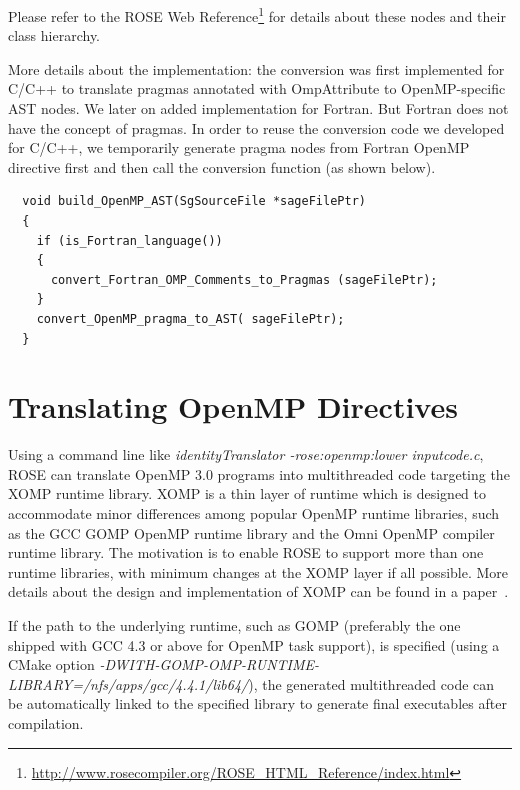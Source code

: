 Please refer to the ROSE Web Reference\footnote{\url{http://www.rosecompiler.org/ROSE_HTML_Reference/index.html}} for details about these nodes and their class hierarchy. 

More details about the implementation: the conversion was first implemented
for C/C++ to translate pragmas annotated with OmpAttribute to
OpenMP-specific AST nodes. We later on added implementation for Fortran. 
But Fortran does not have the concept of pragmas. In order to reuse the conversion
code we developed for C/C++, we temporarily generate pragma nodes from
Fortran OpenMP directive first and then call the conversion function (as shown below). 
\lstset{language=C,basicstyle=\scriptsize,numbers=left}
\begin{lstlisting}
  void build_OpenMP_AST(SgSourceFile *sageFilePtr)
  {
    if (is_Fortran_language())
    {
      convert_Fortran_OMP_Comments_to_Pragmas (sageFilePtr);
    }
    convert_OpenMP_pragma_to_AST( sageFilePtr);
  }

\end{lstlisting}
\lstset{language=C,basicstyle=\small}


\section{Translating OpenMP Directives}
Using a command line like \textit{identityTranslator -rose:openmp:lower inputcode.c},
ROSE can translate OpenMP 3.0 programs into multithreaded code targeting the XOMP runtime library. 
XOMP is a thin layer of runtime which is designed to accommodate minor differences among popular OpenMP runtime libraries, such as the GCC GOMP OpenMP runtime library and the Omni OpenMP compiler runtime library. 
The motivation is to enable ROSE to support more than one runtime libraries, with minimum changes at the XOMP layer if all possible. 
More details about the design and implementation of XOMP can be found in a paper~\cite{LiaoXOMP2010}.

If the path to the underlying runtime, such as GOMP (preferably the one shipped with GCC 4.3 or above for OpenMP task support), is specified (using a CMake option \textit{-DWITH-GOMP-OMP-RUNTIME-LIBRARY=/nfs/apps/gcc/4.4.1/lib64/}),
the generated multithreaded code can be automatically linked to the specified library to generate final executables after compilation. 

